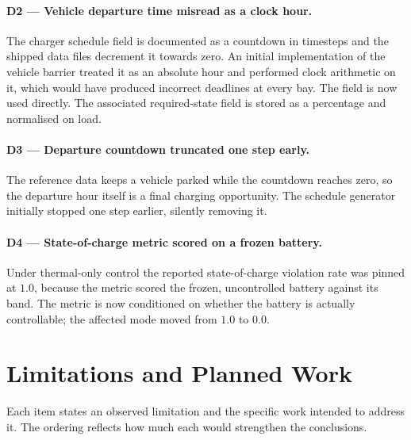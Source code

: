 \documentclass[11pt]{article}
\begin{document}
\paragraph{D2 --- Vehicle departure time misread as a clock hour.} The charger
schedule field is documented as a countdown in timesteps and the shipped data
files decrement it towards zero. An initial implementation of the vehicle barrier
treated it as an absolute hour and performed clock arithmetic on it, which would
have produced incorrect deadlines at every bay. The field is now used directly.
The associated required-state field is stored as a percentage and normalised on
load.

\paragraph{D3 --- Departure countdown truncated one step early.} The reference
data keeps a vehicle parked while the countdown reaches zero, so the departure
hour itself is a final charging opportunity. The schedule generator initially
stopped one step earlier, silently removing it.

\paragraph{D4 --- State-of-charge metric scored on a frozen battery.} Under
thermal-only control the reported state-of-charge violation rate was pinned at
$1.0$, because the metric scored the frozen, uncontrolled battery against its
band. The metric is now conditioned on whether the battery is actually
controllable; the affected mode moved from $1.0$ to $0.0$.

\section{Limitations and Planned Work}
\label{sec:limitations}

Each item states an observed limitation and the specific work intended to address
it. The ordering reflects how much each would strengthen the conclusions.
\end{document}
